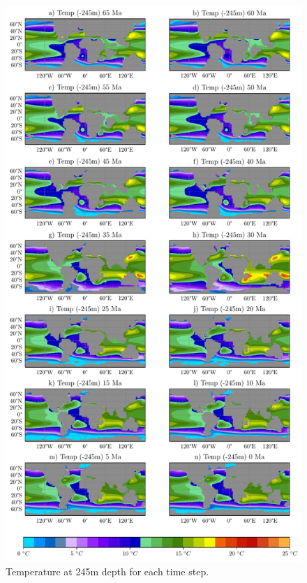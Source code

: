 \documentclass[a4paper]{article}
\begin{document}
\begin{figure}[ht]
	\centering
	\includegraphics[width=0.7\linewidth]{full_sst.pdf}
	\caption{Temperature at 245m depth for each time step.}
	\label{fig:sst_total}
\end{figure}
\end{document}
